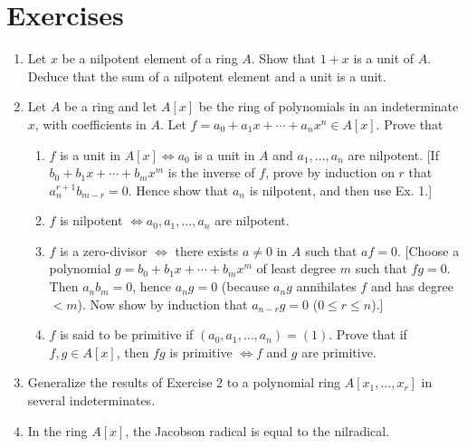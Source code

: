 \documentclass[class=book, crop=false]{standalone}
\theoremstyle{definition}
\theoremstyle{remark}
\begin{document}
\section{Exercises}
\begin{enumerate}[series=exc1]
  \item Let $x$ be a nilpotent element of a ring $A$. Show that $1+x$ is a unit
        of $A$. Deduce that the sum of a nilpotent element and a unit is a unit.

  \item Let $A$ be a ring and let $A[x]$ be the ring of polynomials in an
        indeterminate $x$, with coefficients in $A$. Let
        $f=a_{0}+a_{1} x+\cdots+a_{n} x^{n} \in A[x]$. Prove that
        \begin{enumerate}
          \item $f$ is a unit in $A[x] \iff a_{0}$ is a unit in $A$
                and $a_{1}, \ldots, a_{n}$ are nilpotent. [If
                $b_{0}+b_{1} x+\cdots+b_{m} x^{m}$ is the inverse of $f$, prove
                by induction on $r$ that $a_{n}^{r+1} b_{m-r}=0$. Hence show
                that $a_{n}$ is nilpotent, and then use Ex. 1.]
          \item $f$ is nilpotent $\iff a_{0}, a_{1}, \ldots, a_{n}$
                are nilpotent.
          \item $f$ is a zero-divisor $\iff$ there exists $a \neq 0$
                in $A$ such that $a f=0$. [Choose a polynomial
                $g=b_{0}+b_{1} x+\cdots+b_{m} x^{m}$ of least degree $m$ such
                that $f g=0$. Then $a_{n} b_{m}=0$, hence $a_{n} g=0$ (because
                $a_{n} g$ annihilates $f$ and has degree $<m$). Now show by
                induction that $a_{n - r} g=0$ ($0 \leq r \leq n$).]
          \item $f$ is said to be primitive if
                $\left(a_{0}, a_{1}, \ldots, a_{n}\right)=(1)$. Prove that if
                $f, g \in A[x]$, then $f g$ is primitive $\iff f$ and
                $g$ are primitive.
        \end{enumerate}

  \item Generalize the results of Exercise 2 to a polynomial ring
        $A[x_{1}, \ldots, x_{r}]$ in several indeterminates.

  \item In the ring $A[x]$, the Jacobson radical is equal to the nilradical.


\end{enumerate}
\end{document}
